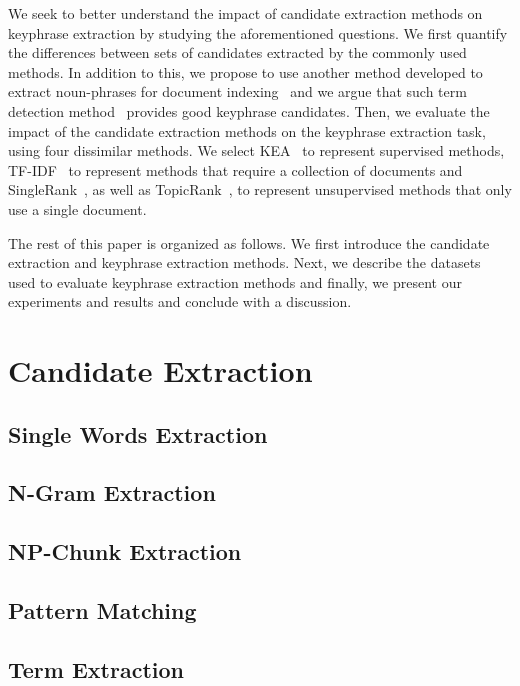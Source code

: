   We seek to better understand the impact of candidate extraction methods on
  keyphrase extraction by studying the aforementioned questions. We first
  quantify the differences between sets of candidates extracted by the commonly
  used methods. In addition to this, we propose to use another method developed
  to extract noun-phrases for document
  indexing~\cite{evans1996nounphraseanalysis} and we argue that such term
  detection method~\cite{castellvi2001automatictermdetection} provides good
  keyphrase candidates. Then, we evaluate the impact of the candidate extraction
  methods on the keyphrase extraction task, using four dissimilar methods. We
  select KEA~\cite{witten1999kea} to represent supervised methods,
  TF-IDF~\cite{jones1972tfidf} to represent methods that require a collection of
  documents and SingleRank~\cite{wan2008expandrank}, as well as
  TopicRank~\cite{bougouin2013topicrank}, to represent unsupervised methods that
  only use a single document.

  The rest of this paper is organized as follows. We first introduce the
  candidate extraction and keyphrase extraction methods. Next, we describe the
  datasets used to evaluate keyphrase extraction methods and finally, we present
  our experiments and results and conclude with a discussion.

\section{Candidate Extraction}
\label{sec:candidate_extraction}

  \subsection{Single Words Extraction}
  \label{subsec:single_words_extraction}
  \subsection{N-Gram Extraction}
  \label{subsec:n_gram_extraction}
  \subsection{NP-Chunk Extraction}
  \label{subsec:np_chunk_extraction}
  \subsection{Pattern Matching}
  \label{subsec:pattern_matching}
  \subsection{Term Extraction}
  \label{subsec:term_extraction}

